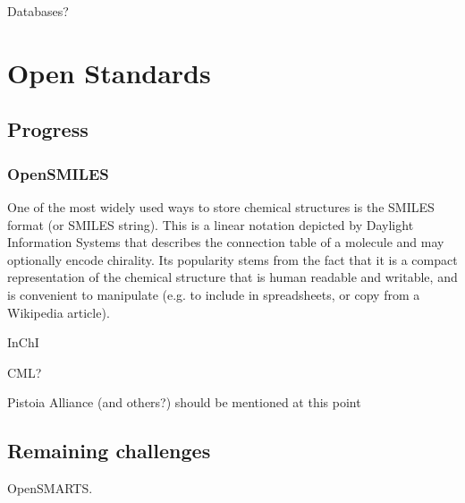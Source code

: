 \documentclass[10pt]{bmc_article}
\newenvironment{bmcformat}{\begin{raggedright}\baselineskip20pt\sloppy\setboolean{publ}{false}}{\end{raggedright}\baselineskip20pt\sloppy}
\begin{document}
\begin{bmcformat}
Databases?

\section*{Open Standards}
  \subsection*{Progress}

    \subsubsection*{OpenSMILES}

One of the most widely used ways to store chemical structures is the SMILES format (or SMILES string). This is a linear notation depicted by Daylight Information Systems that describes the connection table of a molecule and may optionally encode chirality. Its popularity stems from the fact that it is a compact representation of the chemical structure that is human readable and writable, and is convenient to manipulate (e.g. to include in spreadsheets, or copy from a Wikipedia article).



InChI

CML?

Pistoia Alliance (and others?) should be mentioned at this point

  \subsection*{Remaining challenges}

OpenSMARTS.


\end{bmcformat}
\end{document}

